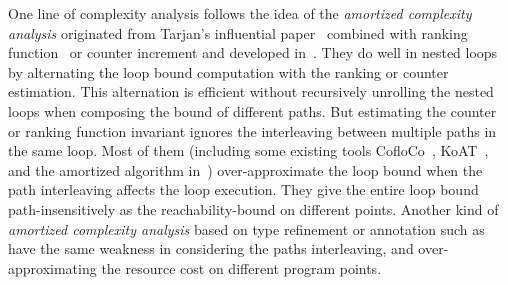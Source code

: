 \begin{itemize}
One line of complexity analysis follows the idea of the \emph{amortized complexity analysis} originated from Tarjan's influential paper~\cite{PotechinP17} combined with ranking function~\cite{BradleyMS05,CookSZ13,Zuleger18} or counter increment and developed in~\cite{ZulegerGSV11,SinnZV14,SinnZV17,LuCT21,AliasDFG10}.
They do well in nested loops by alternating the loop bound computation with the ranking or counter estimation. This alternation is efficient without recursively unrolling the nested loops when composing the bound of different paths.
  But estimating the counter or ranking function invariant ignores the interleaving between multiple paths in the same loop.
Most of them (including some existing tools CofloCo~\cite{Montoya17,Flores-MontoyaH14,Flores-Montoya16}, KoAT~\cite{BrockschmidtEFFG16,BrockschmidtEFFG14,FalkeKS12,FalkeKS11}, and the amortized algorithm in~\cite{LuCT21}) over-approximate the loop bound when the path interleaving affects the loop execution. They give the entire loop bound path-insensitively as the reachability-bound on different points. Another kind of \emph{amortized complexity analysis} based on type refinement or annotation such as~\cite{CraryW00,JostHLH10,CicekBG0H17,RajaniG0021,CarbonneauxHS15} have the same weakness in considering the paths interleaving, and over-approximating the resource cost on different program points.


\end{itemize}
